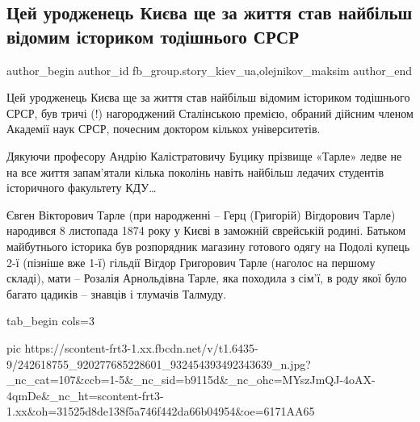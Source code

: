  
 
 
 
 
 
\subsection{Цей уродженець Києва ще за життя став найбільш відомим істориком тодішнього СРСР}
\label{sec:22_09_2021.fb.fb_group.story_kiev_ua.1.evgenij_tarle_istorik_sssr}
 
\ifcmt
 author_begin
   author_id fb_group.story_kiev_ua,olejnikov_maksim
 author_end
\fi

Цей уродженець Києва ще за життя став найбільш відомим істориком тодішнього
СРСР, був тричі (!) нагороджений Сталінською премією, обраний дійсним членом
Академії наук СРСР, почесним доктором кількох університетів. 

Дякуючи професору Андрію Калістратовичу Буцику прізвище «Тарле» ледве не на все
життя запам’ятали кілька поколінь навіть найбільш ледачих студентів історичного
факультету КДУ…

Євген Вікторович Тарле (при народженні – Герц (Григорій) Вігдорович Тарле)
народився 8 листопада 1874 року у Києві в заможній єврейській родині. Батьком
майбутнього історика був розпорядник магазину готового одягу на Подолі купець
2-ї (пізніше вже 1-ї) гільдії Вігдор Григорович Тарле (наголос на першому
складі), мати – Розалія Арнольдівна Тарле, яка походила з сім’ї, в роду якої
було багато цадиків – знавців і тлумачів Талмуду. 


\ifcmt
  tab_begin cols=3

     pic https://scontent-frt3-1.xx.fbcdn.net/v/t1.6435-9/242618755_920277685228601_932454393492343639_n.jpg?_nc_cat=107&ccb=1-5&_nc_sid=b9115d&_nc_ohc=MYszJmQJ-4oAX-4qmDe&_nc_ht=scontent-frt3-1.xx&oh=31525d8de138f5a746f442da66b04954&oe=6171AA65

